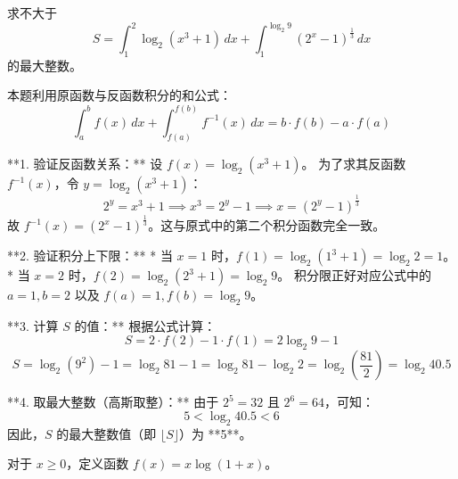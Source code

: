 \begin{questions}
    \question
求不大于
\[
S = \int_{1}^{2} \log_2(x^3 + 1) \,dx + \int_{1}^{\log_2 9} (2^x - 1)^{\frac{1}{3}} \,dx
\]
的最大整数。

\begin{solution}
本题利用原函数与反函数积分的和公式：
\[
\int_{a}^{b} f(x) \,dx + \int_{f(a)}^{f(b)} f^{-1}(x) \,dx = b \cdot f(b) - a \cdot f(a)
\]

**1. 验证反函数关系：**
设 $f(x) = \log_2(x^3 + 1)$。
为了求其反函数 $f^{-1}(x)$，令 $y = \log_2(x^3 + 1)$：
\[
2^y = x^3 + 1 \implies x^3 = 2^y - 1 \implies x = (2^y - 1)^{\frac{1}{3}}
\]
故 $f^{-1}(x) = (2^x - 1)^{\frac{1}{3}}$。这与原式中的第二个积分函数完全一致。

**2. 验证积分上下限：**
* 当 $x = 1$ 时，$f(1) = \log_2(1^3 + 1) = \log_2 2 = 1$。
* 当 $x = 2$ 时，$f(2) = \log_2(2^3 + 1) = \log_2 9$。
积分限正好对应公式中的 $a=1, b=2$ 以及 $f(a)=1, f(b)=\log_2 9$。

**3. 计算 $S$ 的值：**
根据公式计算：
\[
S = 2 \cdot f(2) - 1 \cdot f(1) = 2 \log_2 9 - 1
\]
\[
S = \log_2(9^2) - 1 = \log_2 81 - 1 = \log_2 81 - \log_2 2 = \log_2\left(\frac{81}{2}\right) = \log_2 40.5
\]

**4. 取最大整数（高斯取整）：**
由于 $2^5 = 32$ 且 $2^6 = 64$，可知：
\[
5 < \log_2 40.5 < 6
\]
因此，$S$ 的最大整数值（即 $\lfloor S \rfloor$）为 **5**。
\end{solution}

\question
对于 $x \ge 0$，定义函数 $f(x) = x \log(1 + x)$。
\end{questions}
